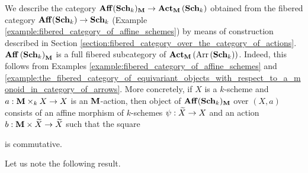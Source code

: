 \begin{remark}\label{remark:equivariant_objects_in_fibered_category_of_relative_affine_schemes}
We describe the category $\mathbf{Aff}(\mathbf{Sch}_k)_{\mathbf{M}} \rightarrow \mathbf{Act}_{\mathbf{M}}\left(\mathbf{Sch}_k\right)$ obtained from the fibered category $\mathbf{Aff}(\mathbf{Sch}_k) \rightarrow \mathbf{Sch}_k$ (Example \ref{example:fibered_category_of_affine_schemes}) by means of construction described in Section \ref{section:fibered_category_over_the_category_of_actions}. $\mathbf{Aff}\left(\mathbf{Sch}_k\right)_{\mathbf{M}}$ is a full fibered subcategory of $\mathbf{Act}_{\mathbf{M}}\left(\mathrm{Arr}\left(\mathbf{Sch}_k\right)\right)$. Indeed, this follows from Examples \ref{example:fibered_category_of_affine_schemes} and \ref{example:the_fibered_category_of_equivariant_objects_with_respect_to_a_monoid_in_category_of_arrows}. More concretely, if $X$ is a $k$-scheme and $a:\mathbf{M}\times_kX\rightarrow X$ is an $\mathbf{M}$-action, then object of $\mathbf{Aff}(\mathbf{Sch}_k)_{\mathbf{M}}$ over $(X,a)$ consists of an affine morphism of $k$-schemes $\psi:\widetilde{X}\rightarrow X$ and an action $b:\mathbf{M}\times \widetilde{X}\rightarrow \widetilde{X}$ such that the square
\begin{center}
\end{center}
is commutative.
\end{remark}
\noindent
Let us note the following result.

